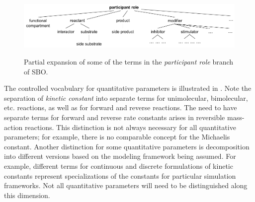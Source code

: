 \begin{figure}[htb]
  \centering
             {\includegraphics[scale=0.8]{figs/sbo-participant-role-l3v2}}
  \caption{Partial expansion of some of the terms in the
    \emph{participant role} branch of SBO.}
  \label{fig:expanded-speciesRef}
\end{figure}

The controlled vocabulary for quantitative parameters is
illustrated in .  Note the
separation of \emph{kinetic constant} into separate terms for
unimolecular, bimolecular, etc. reactions, as well as for forward
and reverse reactions.  The need to have separate terms for
forward and reverse rate constants arises in reversible
mass-action reactions.  This distinction is not always necessary
for all quantitative parameters; for example, there is no
comparable concept for the Michaelis constant.  Another
distinction for some quantitative parameters is decomposition into
different versions based on the modeling framework being assumed.
For example, different terms for continuous and discrete
formulations of kinetic constants represent specializations of the
constants for particular simulation frameworks.  Not all
quantitative parameters will need to be distinguished along this
dimension.

